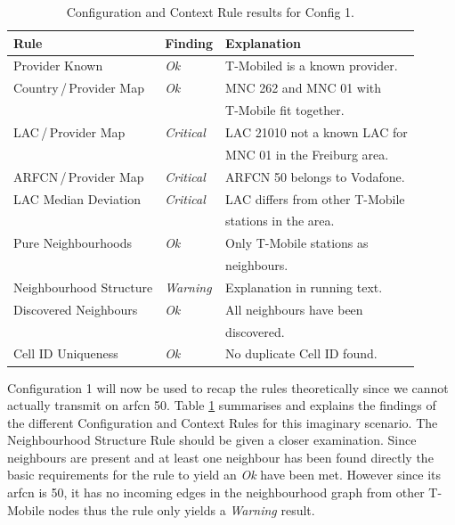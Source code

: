 \begin{table}
\centering
\begin{tabular}{lll}
\toprule
Rule							&Finding		&Explanation		\\
\midrule
Provider Known					&\emph{Ok}		&T-Mobiled is a known provider.\\
Country\,/\,Provider Map		&\emph{Ok}		&MNC 262 and MNC 01 with\\
								&				&T-Mobile fit together.\\
LAC\,/\,Provider Map			&\emph{Critical}&LAC 21010 not a known LAC for\\ 
								&				&MNC 01 in the Freiburg area.\\
ARFCN\,/\,Provider Map			&\emph{Critical}&ARFCN 50 belongs to Vodafone.\\
LAC Median Deviation			&\emph{Critical}&LAC differs from other T-Mobile\\
								&				&stations in the area.\\
Pure Neighbourhoods				&\emph{Ok}		&Only T-Mobile stations as\\
								&				& neighbours.\\
Neighbourhood Structure			&\emph{Warning}	&Explanation in running text.\\
Discovered Neighbours			&\emph{Ok}		&All neighbours have been\\
								&				&discovered.\\
Cell ID Uniqueness				&\emph{Ok}		&No duplicate Cell ID found.\\
\bottomrule
\end{tabular}
\caption{Configuration and Context Rule results for Config 1.}
\label{tab:config_rules_eval}
\end{table}

Configuration 1 will now be used to recap the rules theoretically since we cannot actually transmit on \gls{arfcn} 50.
Table \ref{tab:config_rules_eval} summarises and explains the findings of the different Configuration and Context Rules for this imaginary scenario.
The Neighbourhood Structure Rule should be given a closer examination.
Since neighbours are present and at least one neighbour has been found directly the basic requirements for the rule to yield an \emph{Ok} have been met.
However since its \gls{arfcn} is 50, it has no incoming edges in the neighbourhood graph from other T-Mobile nodes thus the rule only yields a \emph{Warning} result.

